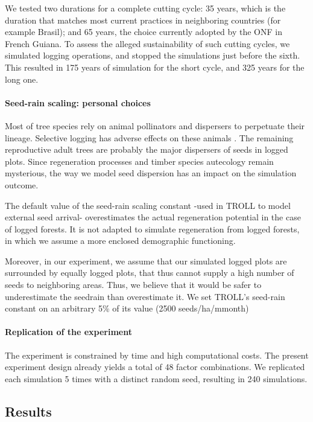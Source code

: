 \documentclass[12pt,]{article}
\theoremstyle{definition}
\theoremstyle{definition}
\theoremstyle{definition}
\theoremstyle{remark}
\begin{document}
We tested two durations for a complete cutting cycle: 35 years, which is
the duration that matches most current practices in neighboring
countries (for example Brasil); and 65 years, the choice currently
adopted by the ONF in French Guiana. To assess the alleged
sustainability of such cutting cycles, we simulated logging operations,
and stopped the simulations just before the sixth. This resulted in 175
years of simulation for the short cycle, and 325 years for the long one.

\paragraph{Seed-rain scaling: personal
choices}\label{seed-rain-scaling-personal-choices}

Most of tree species rely on animal pollinators and dispersers to
perpetuate their lineage. Selective logging has adverse effects on these
animals \citep{Kormos2012}. The remaining reproductive adult trees are
probably the major dispersers of seeds in logged plots. Since
regeneration processes and timber species autecology remain mysterious,
the way we model seed dispersion has an impact on the simulation
outcome.

The default value of the seed-rain scaling constant -used in TROLL to
model external seed arrival- overestimates the actual regeneration
potential in the case of logged forests. It is not adapted to simulate
regeneration from logged forests, in which we assume a more enclosed
demographic functioning.

Moreover, in our experiment, we assume that our simulated logged plots
are surrounded by equally logged plots, that thus cannot supply a high
number of seeds to neighboring areas. Thus, we believe that it would be
safer to underestimate the seedrain than overestimate it. We set TROLL's
seed-rain constant on an arbitrary 5\% of its value (2500
seeds/ha/mmonth)

\paragraph{Replication of the
experiment}\label{replication-of-the-experiment}

The experiment is constrained by time and high computational costs. The
present experiment design already yields a total of 48 factor
combinations. We replicated each simulation 5 times with a distinct
random seed, resulting in 240 simulations.

\subsection{Results}\label{results}
\end{document}
